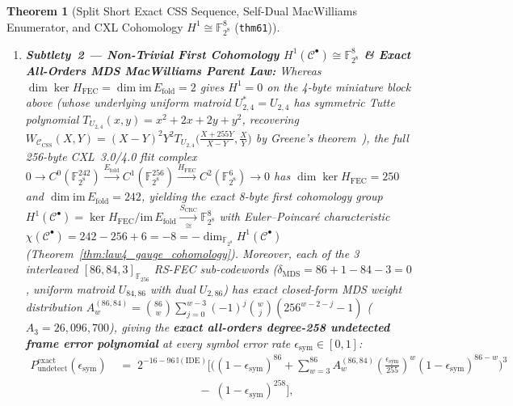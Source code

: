 \documentclass[11pt,letterpaper]{article}
\theoremstyle{spectralthm}
\newtheorem{theorem}{Theorem}[section]
\begin{document}
\begin{theorem}[Split Short Exact CSS Sequence, Self-Dual MacWilliams Enumerator, and CXL Cohomology $H^1 \cong \mathbb{F}_{2^8}^8$ (\texttt{thm61})]
\begin{enumerate}
\item \textbf{Subtlety~2 --- Non-Trivial First Cohomology $H^1(\mathcal{C}^\bullet) \cong \mathbb{F}_{2^8}^8$ \& Exact All-Orders MDS MacWilliams Parent Law:} Whereas $\dim\ker H_{\mathrm{FEC}} = \dim\mathrm{im}\,E_{\mathrm{fold}} = 2$ gives $H^1 = 0$ on the 4-byte miniature block above (whose underlying uniform matroid $U_{2,4}^* = U_{2,4}$ has symmetric Tutte polynomial $T_{U_{2,4}}(x,y) = x^2 + 2x + 2y + y^2$, recovering $W_{\mathcal{C}_{\mathrm{CSS}}}(X,Y) = (X-Y)^2 Y^2 T_{U_{2,4}}\!\bigl(\frac{X+255Y}{X-Y},\frac{X}{Y}\bigr)$ by Greene's theorem~\cite{greene1976weight}), the full 256-byte CXL~3.0/4.0 flit complex $0 \to C^0(\mathbb{F}_{2^8}^{242}) \xrightarrow{E_{\mathrm{fold}}} C^1(\mathbb{F}_{2^8}^{256}) \xrightarrow{H_{\mathrm{FEC}}} C^2(\mathbb{F}_{2^8}^6) \to 0$ has $\dim\ker H_{\mathrm{FEC}} = 250$ and $\dim\mathrm{im}\,E_{\mathrm{fold}} = 242$, yielding the exact 8-byte first cohomology group $H^1(\mathcal{C}^\bullet) = \ker H_{\mathrm{FEC}} / \mathrm{im}\,E_{\mathrm{fold}} \xrightarrow[\cong]{S_{\mathrm{CRC}}} \mathbb{F}_{2^8}^8$ with Euler--Poincar\'{e} characteristic $\chi(\mathcal{C}^\bullet) = 242 - 256 + 6 = -8 = -\dim_{\mathbb{F}_{2^8}} H^1(\mathcal{C}^\bullet)$ (Theorem~\ref{thm:law4_gauge_cohomology}). Moreover, each of the 3 interleaved $[86,84,3]_{\mathbb{F}_{256}}$ RS-FEC sub-codewords ($\delta_{\mathrm{MDS}} = 86 + 1 - 84 - 3 = 0$, uniform matroid $U_{84,86}$ with dual $U_{2,86}$) has exact closed-form MDS weight distribution $A_w^{(86,84)} = \binom{86}{w}\sum_{j=0}^{w-3}(-1)^j\binom{w}{j}(256^{w-2-j}-1)$ ($A_3 = 26{,}096{,}700$), giving the \textbf{exact all-orders degree-258 undetected frame error polynomial} at every symbol error rate $\epsilon_{\mathrm{sym}} \in [0,1]$:
\begin{equation}
\label{eq:exact_macwilliams_all_orders}
\begin{aligned}
P_{\mathrm{undetect}}^{\mathrm{exact}}(\epsilon_{\mathrm{sym}}) \;&=\; 2^{-16 - 96\,\mathbb{I}(\mathrm{IDE})}\Biggl[\Biggl((1-\epsilon_{\mathrm{sym}})^{86} + \sum_{w=3}^{86} A_w^{(86,84)}\!\left(\frac{\epsilon_{\mathrm{sym}}}{255}\right)^{\!w}\!(1-\epsilon_{\mathrm{sym}})^{86-w}\Biggr)^{\!3} \\
&\qquad\qquad\qquad\quad -\; (1-\epsilon_{\mathrm{sym}})^{258}\Biggr],
\end{aligned}
\end{equation}

\end{enumerate}
\end{theorem}
\end{document}
